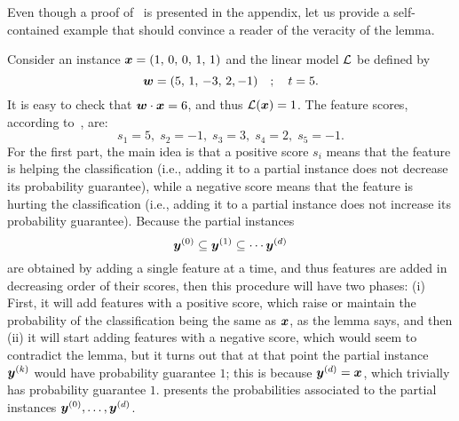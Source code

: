 Even though a proof of~ is presented in the appendix, let us provide a self-contained example that should convince a reader of the veracity of the lemma.
\begin{example}\label{ex:greedy}
 Consider an instance ${\bm{x}} = (1,\, 0, \, 0, \, 1, \, 1)$ and the linear model $\mathcal{L}$ be defined by 
 \[ 
    {\bm{w}} = (5, \, 1, \, -3,\, 2, -1) \quad ; \quad t = 5.
 \]
 It is easy to check that ${\bm{w}} \cdot {\bm{x}} = 6$, and thus $\mathcal{L}({\bm{x}}) = 1$. The feature scores, according to~, are:
 \[
  s_1 = 5, \; s_2 = -1, \; s_3 = 3, \; s_4 = 2, \; s_5 = -1.
 \]
For the first part, the main idea is that a positive score $s_i$ means that the feature is helping the classification (i.e., adding it to a partial instance does not decrease its probability guarantee), while a negative score means that the feature is hurting the classification (i.e., adding it to a partial instance does not increase its probability guarantee). 
Because the partial instances 
\[ {\bm{y}}^{(0)} \subseteq {\bm{y}}^{(1)} \subseteq \cdots {\bm{y}}^{(d)}
\] 
are obtained by adding a single feature at a time, and thus features are added in decreasing order of their scores, then this procedure will have two phases: (i) First, it will add features with a positive score, which raise or maintain the probability of the classification being the same as ${\bm{x}}$, as the lemma says, and then (ii) it will start adding features with a negative score, which would seem to contradict the lemma, but it turns out that at that point the partial instance ${\bm{y}}^{(k)}$ would have probability guarantee $1$; this is because ${\bm{y}}^{(d)} = {\bm{x}}$, which trivially has probability guarantee $1$.
 presents the probabilities associated to the partial instances ${\bm{y}}^{(0)}, \ldots, {\bm{y}}^{(d)}$.


\end{example}
